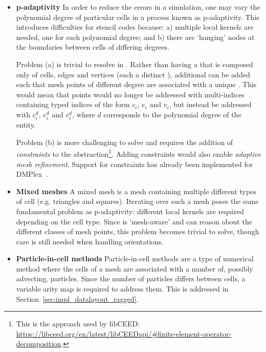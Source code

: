 \begin{itemize}
  \item
    \textbf{p-adaptivity}
    In order to reduce the errors in a simulation, one may vary the polynomial degree of particular cells in a process known as p-adaptivity.
    This introduces difficulties for stencil codes because:
    a) multiple local kernels are needed, one for each polynomial degree; and
    b) there are `hanging' nodes at the boundaries between cells of differing degrees.

    Problem (a) is trivial to resolve in .
    Rather than having a  that is composed only of cells, edges and vertices (each a distinct ), additional  can be added such that mesh points of different degree are associated with a unique .
    This would mean that points would no longer be addressed with multi-indices containing typed indices of the form $c_i$, $e_i$ and $v_i$, but instead be addressed with $c^d_i$, $e^d_i$ and $v^d_i$, where $d$ corresponds to the polynomial degree of the entity.

    Problem (b) is more challenging to solve and requires the addition of \textit{constraints} to the abstraction\footnote{This is the approach used by libCEED: \url{https://libceed.org/en/latest/libCEEDapi/\#finite-element-operator-decomposition}.}.
    Adding constraints would also enable \textit{adaptive mesh refinement}.
    Support for constraints has already been implemented for DMPlex~\cite{isaacSupportNonconformalMeshes2015}.

  \item
    \textbf{Mixed meshes}
    A mixed mesh is a mesh containing multiple different types of cell (e.g. triangles and squares).
    Iterating over such a mesh poses the same fundamental problem as p-adaptivity: different local kernels are required depending on the cell type.
    Since  is `mesh-aware' and can reason about the different classes of mesh points, this problem becomes trivial to solve, though care is still needed when handling orientations.

  \item
    \textbf{Particle-in-cell methods}
    Particle-in-cell methods are a type of numerical method where the cells of a mesh are associated with a number of, possibly advecting, particles.
    Since the number of particles differs between cells, a variable arity map is required to address them.
    This is addressed in Section~\ref{sec:impl_datalayout_ragged}.
\end{itemize}

